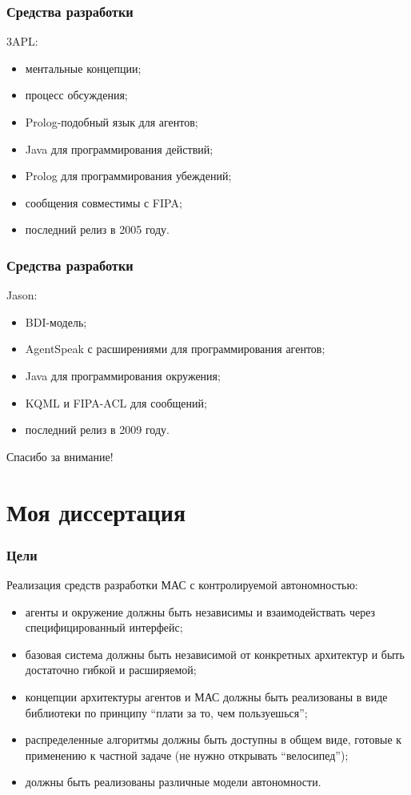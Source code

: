 \documentclass{beamer}
\begin{document}
\begin{frame}
  \frametitle{Средства разработки}
  3APL:
  \begin{itemize}
    \item ментальные концепции;
    \item процесс обсуждения;
    \item Prolog-подобный язык для агентов;
    \item Java для программирования действий;
    \item Prolog для программирования убеждений;
    \item сообщения совместимы с FIPA;
    \item последний релиз в 2005 году.
  \end{itemize}
\end{frame}

\begin{frame}
  \frametitle{Средства разработки}
  Jason:
  \begin{itemize}
    \item BDI-модель;
    \item AgentSpeak с расширениями для программирования агентов;
    \item Java для программирования окружения;
    \item KQML и FIPA-ACL для сообщений;
    \item последний релиз в 2009 году.
  \end{itemize}
\end{frame}

\begin{frame}{}
\addtocounter{framenumber}{-1}
\begin{center}
\LARGE{Спасибо за внимание!}
\end{center}
\end{frame}

\section{Моя диссертация}

\begin{frame}
  \frametitle{Цели}
  Реализация средств разработки МАС с контролируемой автономностью:
  \begin{itemize}
    \item агенты и окружение должны быть независимы и взаимодействать через
      специфицированный интерфейс;
    \item базовая система должны быть независимой от конкретных архитектур и
      быть достаточно гибкой и расширяемой;
    \item концепции архитектуры агентов и МАС должны быть реализованы в виде библиотеки
      по принципу ``плати за то, чем пользуешься'';
    \item распределенные алгоритмы должны быть доступны в общем виде, готовые к применению
      к частной задаче (не нужно открывать ``велосипед'');
    \item должны быть реализованы различные модели автономности.
  \end{itemize}
\end{frame}
\end{document}
